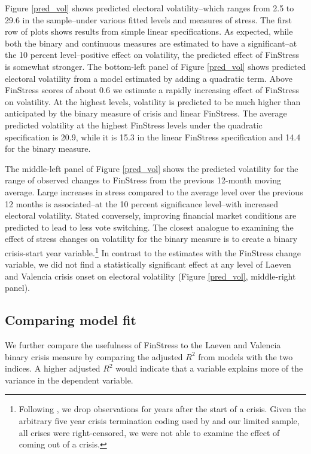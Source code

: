 \documentclass[]{article}
\begin{document}
Figure \ref{pred_vol} shows predicted electoral volatility--which ranges from 2.5 to 29.6 in the sample--under various fitted levels and measures of stress. The first row of plots shows results from simple linear specifications. As expected, while both the binary and continuous measures are estimated to have a significant--at the 10 percent level--positive effect on volatility, the predicted effect of FinStress is somewhat stronger. The bottom-left panel of Figure \ref{pred_vol} shows predicted electoral volatility from a model estimated by adding a quadratic term. Above FinStress scores of about 0.6 we estimate a rapidly increasing effect of FinStress on volatility. At the highest levels, volatility is predicted to be much higher than anticipated by the binary measure of crisis and linear FinStress. The average predicted volatility at the highest FinStress levels under the quadratic specification is 20.9, while it is 15.3 in the linear FinStress specification and 14.4 for the binary measure.

The middle-left panel of Figure \ref{pred_vol} shows the predicted volatility for the range of observed changes to FinStress from the previous 12-month moving average. Large increases in stress compared to the average level over the previous 12 months is associated--at the 10 percent significance level--with increased electoral volatility. Stated conversely, improving financial market conditions are predicted to lead to less vote switching. The closest analogue to examining the effect of stress changes on volatility for the binary measure is to create a binary crisis-start year variable.\footnote{Following \cite{McGrath2015}, we drop observations for years after the start of a crisis. Given the arbitrary five year crisis termination coding used by \cite{laeven2013} and our limited sample, all crises were right-censored, we were not able to examine the effect of coming out of a crisis.} In contrast to the estimates with the FinStress change variable, we did not find a statistically significant effect at any level of Laeven and Valencia crisis onset on electoral volatility (Figure \ref{pred_vol}, middle-right panel).

\subsection{Comparing model fit}

We further compare the usefulness of FinStress to the Laeven and Valencia binary crisis measure by comparing the adjusted $R^2$ from models with the two indices. A higher adjusted $R^2$ would indicate that a variable explains more of the variance in the dependent variable.
\end{document}
